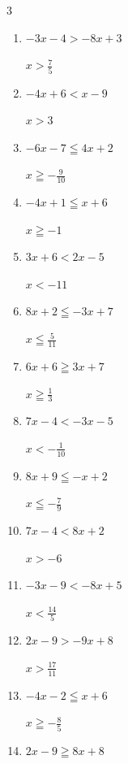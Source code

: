 \begin{multicols}{3}
\begin{enumerate}
  \itemsep=9pt
  \item $-3x-4>-8x+3$

        $\displaystyle x>\frac{7}{5}$

  \item $-4x+6<x-9$

        $\displaystyle x>3$

  \item $-6x-7\leqq 4x+2$

        $\displaystyle x\geqq -\frac{9}{10}$

  \item $-4x+1\leqq x+6$

        $\displaystyle x\geqq -1$

  \item $3x+6<2x-5$

        $\displaystyle x<-11$

  \item $8x+2\leqq -3x+7$

        $\displaystyle x\leqq \frac{5}{11}$

  \item $6x+6\geqq 3x+7$

        $\displaystyle x\geqq \frac{1}{3}$

  \item $7x-4<-3x-5$

        $\displaystyle x<-\frac{1}{10}$

  \item $8x+9\leqq -x+2$

        $\displaystyle x\leqq -\frac{7}{9}$

  \item $7x-4<8x+2$

        $\displaystyle x>-6$

  \item $-3x-9<-8x+5$

        $\displaystyle x<\frac{14}{5}$

  \item $2x-9>-9x+8$

        $\displaystyle x>\frac{17}{11}$

  \item $-4x-2\leqq x+6$

        $\displaystyle x\geqq -\frac{8}{5}$

  \item $2x-9\geqq 8x+8$


\end{enumerate}
\end{multicols}
